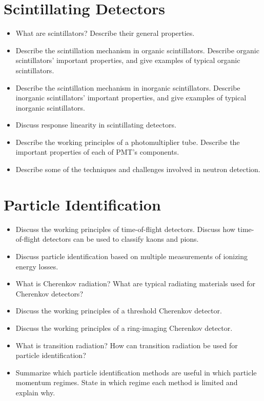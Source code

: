 \section{Scintillating Detectors}
\begin{itemize}

    \item What are scintillators?
    Describe their general properties.

    \item Describe the scintillation mechanism in organic scintillators. 
    Describe organic scintillators' important properties, and give examples of typical organic scintillators.

    \item Describe the scintillation mechanism in inorganic scintillators.
    Describe inorganic scintillators' important properties, and give examples of typical inorganic scintillators.

    \item Discuss response linearity in scintillating detectors.

    \item Describe the working principles of a photomultiplier tube.
    Describe the important properties of each of PMT's components.

    \item Describe some of the techniques and challenges involved in neutron detection.

\end{itemize}

\section{Particle Identification}
\begin{itemize}

    \item Discuss the working principles of time-of-flight detectors. 
    Discuss how time-of-flight detectors can be used to classify kaons and pions.

    \item Discuss particle identification based on multiple measurements of ionizing energy losses.

    \item What is Cherenkov radiation?
    What are typical radiating materials used for Cherenkov detectors?

    \item Discuss the working principles of a threshold Cherenkov detector.

    \item Discuss the working principles of a ring-imaging Cherenkov detector.

    \item What is transition radiation? How can transition radiation be used for particle identification?

    \item Summarize which particle identification methods are useful in which particle momentum regimes.
    State in which regime each method is limited and explain why.

\end{itemize}

